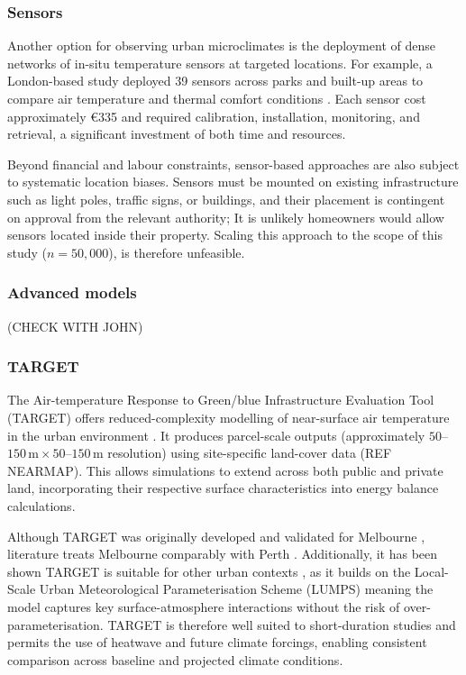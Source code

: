 \documentclass[a4paper, 12pt]{report}
\begin{document}
\subsubsection{Sensors}
Another option for observing urban microclimates is the deployment of dense networks of in-situ temperature sensors at targeted locations. For example, a London-based study deployed 39 sensors across parks and built-up areas to compare air temperature and thermal comfort conditions \parencite{london-study}. Each sensor cost approximately \euro 335 and required calibration, installation, monitoring, and retrieval, a significant investment of both time and resources.

Beyond financial and labour constraints, sensor-based approaches are also subject to systematic location biases. Sensors must be mounted on existing infrastructure such as light poles, traffic signs, or buildings, and their placement is contingent on approval from the relevant authority; It is unlikely homeowners would allow sensors located inside their property. Scaling this approach to the scope of this study ($n = 50,000$), is therefore unfeasible.
\subsubsection{Advanced models}
(CHECK WITH JOHN)
\subsubsection{TARGET}
The Air-temperature Response to Green/blue Infrastructure Evaluation Tool (TARGET) offers reduced-complexity modelling of near-surface air temperature in the urban environment \parencite{TARGET}. It produces parcel-scale outputs (approximately $50$--$150\,\text{m} \times 50$--$150\,\text{m}$ resolution) using site-specific land-cover data (REF NEARMAP). This allows simulations to extend across both public and private land, incorporating their respective surface characteristics into energy balance calculations.

Although TARGET was originally developed and validated for Melbourne \parencite{TARGET}, literature treats Melbourne comparably with Perth \parencite{Perth-Melbourne}. Additionally, it has been shown TARGET is suitable for other urban contexts \parencite{Fast-urban-climate-model-GBI}, as it  builds on the Local-Scale Urban Meteorological Parameterisation Scheme (LUMPS) \parencite{LUMPS} meaning the model captures key surface-atmosphere interactions without the risk of over-parameterisation. TARGET is therefore well suited to short-duration studies and permits the use of heatwave and future climate forcings, enabling consistent comparison across baseline and projected climate conditions. 
\end{document}

